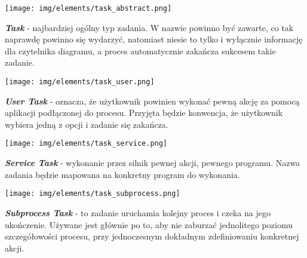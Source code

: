 \documentclass[declaration,shortabstract,mgr]{iithesis}
\begin{document}
\noindent\begin{minipage}[t]{0.1\textwidth}\vspace{0pt}
\texttt{[image: img/elements/task\_abstract.png]}
\end{minipage}\hfill
\begin{minipage}[t]{0.85\textwidth}\vspace{0pt}
\textbf{\textit{Task}} - najbardziej ogólny typ zadania. W nazwie powinno być zawarte, co tak naprawdę powinno się wydarzyć, natomiast niesie to tylko i wyłącznie informację dla czytelnika diagramu, a proces automatycznie zakańcza sukcesem takie zadanie.
\end{minipage}

\vspace{\mypointsep}

\noindent\begin{minipage}[t]{0.1\textwidth}\vspace{0pt}
\texttt{[image: img/elements/task\_user.png]}
\end{minipage}\hfill
\begin{minipage}[t]{0.85\textwidth}\vspace{0pt}
\textbf{\textit{User Task}} - oznacza, że użytkownik powinien wykonać pewną akcję za pomocą aplikacji podłączonej do procesu. Przyjęta będzie konwencja, że użytkownik wybiera jedną z opcji i zadanie się zakańcza.
\end{minipage}

\vspace{\mypointsep}

\noindent\begin{minipage}[t]{0.1\textwidth}\vspace{0pt}
\texttt{[image: img/elements/task\_service.png]}
\end{minipage}\hfill
\begin{minipage}[t]{0.85\textwidth}\vspace{0pt}
\textbf{\textit{Service Task}} - wykonanie przez silnik pewnej akcji, pewnego programu. Nazwa zadania będzie mapowana na konkretny program do wykonania.
\end{minipage}

\vspace{\mypointsep}

\noindent\begin{minipage}[t]{0.1\textwidth}\vspace{0pt}
\texttt{[image: img/elements/task\_subprocess.png]}
\end{minipage}\hfill
\begin{minipage}[t]{0.85\textwidth}\vspace{0pt}
\textbf{\textit{Subprocess Task}} - to zadanie uruchamia kolejny proces i czeka na jego ukończenie. Używane jest głównie po to, aby nie zaburzać jednolitego poziomu szczegółowości procesu, przy jednoczesnym dokładnym zdefiniowaniu konkretnej akcji.
\end{minipage}
\end{document}
